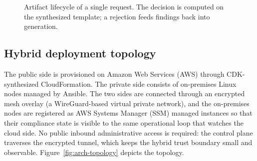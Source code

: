 \begin{figure}[ht]
\centering
{}
\caption{Artifact lifecycle of a single request. The decision is computed on the
synthesized template; a rejection feeds findings back into generation.}
\label{fig:arch-dataflow}
\end{figure}

\subsection{Hybrid deployment topology}
\label{subsec:arch-topology}

The public side is provisioned on Amazon Web Services (AWS) through CDK-synthesized
CloudFormation. The private side consists of on-premises Linux nodes managed by Ansible.
The two sides are connected through an encrypted mesh overlay (a WireGuard-based virtual
private network), and the on-premises nodes are registered as AWS Systems Manager (SSM)
managed instances so that their compliance state is visible to the same operational loop
that watches the cloud side. No public inbound administrative access is required: the
control plane traverses the encrypted tunnel, which keeps the hybrid trust boundary
small and observable. Figure~\ref{fig:arch-topology} depicts the topology.

